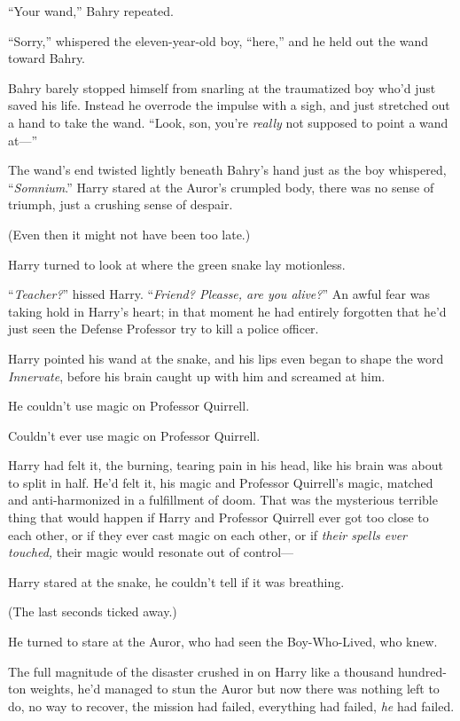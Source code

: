 “Your wand,” Bahry repeated.

“Sorry,” whispered the eleven-year-old boy, “here,” and he held out the wand toward Bahry.

Bahry barely stopped himself from snarling at the traumatized boy who’d just saved his life. Instead he overrode the impulse with a sigh, and just stretched out a hand to take the wand. “Look, son, you’re \emph{really} not supposed to point a wand at—”

The wand’s end twisted lightly beneath Bahry’s hand just as the boy whispered, “\emph{Somnium}.”
\sbreak
Harry stared at the Auror’s crumpled body, there was no sense of triumph, just a crushing sense of despair.

(Even then it might not have been too late.)

Harry turned to look at where the green snake lay motionless.

“\emph{Teacher?}” hissed Harry. “\emph{Friend? Pleasse, are you alive?}” An awful fear was taking hold in Harry’s heart; in that moment he had entirely forgotten that he’d just seen the Defense Professor try to kill a police officer.

Harry pointed his wand at the snake, and his lips even began to shape the word \emph{Innervate}, before his brain caught up with him and screamed at him.

He couldn’t use magic on Professor Quirrell.

Couldn’t ever use magic on Professor Quirrell.

Harry had felt it, the burning, tearing pain in his head, like his brain was about to split in half. He’d felt it, his magic and Professor Quirrell’s magic, matched and anti-harmonized in a fulfillment of doom. That was the mysterious terrible thing that would happen if Harry and Professor Quirrell ever got too close to each other, or if they ever cast magic on each other, or if \emph{their spells ever touched,} their magic would resonate out of control—

Harry stared at the snake, he couldn’t tell if it was breathing.

(The last seconds ticked away.)

He turned to stare at the Auror, who had seen the Boy-Who-Lived, who knew.

The full magnitude of the disaster crushed in on Harry like a thousand hundred-ton weights, he’d managed to stun the Auror but now there was nothing left to do, no way to recover, the mission had failed, everything had failed, \emph{he} had failed.

